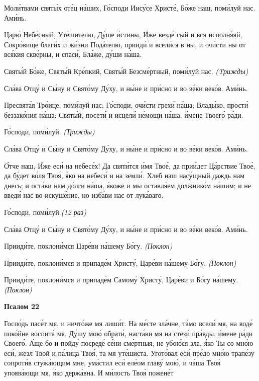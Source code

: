 \mychapterending





Моли́твами святы́х оте́ц на́ших, Го́споди Иису́се Христе́, Бо́же наш,
поми́луй нас. Ами́нь.


   Царю́ Небе́сный, Уте́шителю, Ду́ше и́стины, И́же везде́ сый и вся
исполня́яй, Сокро́вище благи́х и жи́зни Пода́телю, прииди́ и всели́ся в ны, и
очи́сти ны от вся́кия скве́рны, и спаси́, Бла́же, ду́ши на́ша.


   Святы́й Бо́же, Святы́й Кре́пкий, Святы́й Безсме́ртный, поми́луй нас.
\itshape (Tрижды)\normalfont{}


   Сла́ва Отцу́ и Сы́ну и Свято́му Ду́ху, и ны́не и при́сно и во ве́ки веко́в.
Ами́нь.


   Пресвята́я Тро́ице, поми́луй нас; Го́споди, очи́сти грехи́ на́ша; Влады́ко,
прости́ беззако́ния на́ша; Святы́й, посети́ и исцели́ не́мощи на́ша, и́мене
Твоего́ ра́ди.


   Го́споди, поми́луй. \itshape (Трижды)\normalfont{}


   Сла́ва Отцу́ и Сы́ну и Свято́му Ду́ху, и ны́не и при́сно и во ве́ки веко́в.
Ами́нь.


   О́тче наш, И́же еси́ на небесе́х! Да святи́тся и́мя Твое́, да прии́дет
Ца́рствие Твое́, да бу́дет во́ля Твоя́, я́ко на небеси́ и на земли́. Хлеб наш
насу́щный даждь нам днесь; и оста́ви нам до́лги на́ша, я́коже и мы оставля́ем
должнико́м на́шим; и не введи́ нас во искуше́ние, но изба́ви нас от
лука́ваго.


   Го́споди, поми́луй.\itshape (12 раз)\normalfont{}


   Сла́ва Отцу́ и Сы́ну и Свято́му Ду́ху, и ны́не и при́сно и во ве́ки веко́в.
Ами́нь.


   Прииди́те, поклони́мся Царе́ви на́шему Бо́гу. \itshape (Поклон)\normalfont{}


   Прииди́те, поклони́мся и припаде́м Христу́, Царе́ви на́шему Бо́гу.
\itshape (Поклон)\normalfont{}


   Прииди́те, поклони́мся и припаде́м Самому́ Христу́, Царе́ви и Бо́гу
на́шему. \itshape (Поклон)\normalfont{}



 

\bfseries Псалом 22\normalfont{}


   Госпо́дь пасе́т мя, и ничто́же мя лиши́т. На ме́сте зла́чне, та́мо всели́ мя,
на воде́ поко́йне воспита́ мя. Ду́шу мою́ обрати́, наста́ви мя на стези́ пра́вды,
и́мене ра́ди Своего́. А́ще бо и пойду́ посреде́ се́ни сме́ртныя, не убою́ся зла,
я́ко Ты со мно́ю еси́, жезл Твой и па́лица Твоя́, та мя уте́шиста. Угото́вал
еси́ пре́до мно́ю трапе́зу сопроти́в стужа́ющим мне, ума́стил еси́ еле́ом главу́
мою́, и ча́ша Твоя́ упоява́ющи мя, я́ко держа́вна. И ми́лость Твоя́ пожене́т

